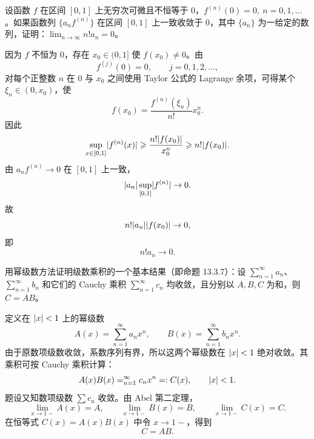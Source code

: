 \begin{xreferenceproblem}[6]
设函数 $f$ 在区间 $[0,1]$ 上无穷次可微且不恒等于 $0$，$f^{(n)}(0)=0,\ n=0,1,\ldots$。如果函数列 $\{a_nf^{(n)}\}$ 在区间 $[0,1]$ 上一致收敛于 $0$，其中 $\{a_n\}$ 为一给定的数列，证明：$\displaystyle\lim_{n\to\infty}n!a_n=0$。
\end{xreferenceproblem}
\begin{xsolution}
因为 $f$ 不恒为 $0$，存在 $x_0\in(0,1]$ 使 $f(x_0)\ne0$。由
\[
  f^{(j)}(0)=0,
  \qquad j=0,1,2,\ldots,
\]
对每个正整数 $n$ 在 $0$ 与 $x_0$ 之间使用 Taylor 公式的 Lagrange 余项，可得某个 $\xi_n\in(0,x_0)$，使
\[
  f(x_0)=\frac{f^{(n)}(\xi_n)}{n!}x_0^n.
\]
因此
\[
  \sup_{x\in[0,1]}\lvert f^{(n)}(x)\rvert
  \geqslant\frac{n!\lvert f(x_0)\rvert}{x_0^n}
  \geqslant n!\lvert f(x_0)\rvert.
\]
由 $a_nf^{(n)}\to0$ 在 $[0,1]$ 上一致，
\[
  \lvert a_n\rvert\sup_{[0,1]}\lvert f^{(n)}\rvert\to0.
\]
故
\[
  n!\lvert a_n\rvert\lvert f(x_0)\rvert\to0,
\]
即
\[
  \boxed{n!a_n\to0}.
\]
\end{xsolution}


\begin{xreferenceproblem}[7]
用幂级数方法证明级数乘积的一个基本结果（即命题 13.3.7）：设 $\displaystyle\sum_{n=1}^{\infty}a_n$、$\displaystyle\sum_{n=1}^{\infty}b_n$ 和它们的 Cauchy 乘积 $\displaystyle\sum_{n=1}^{\infty}c_n$ 均收敛，且分别以 $A,B,C$ 为和，则 $C=AB$。
\end{xreferenceproblem}
\begin{xsolution}
定义在 $\lvert x\rvert<1$ 上的幂级数
\[
  A(x)=\sum_{n=1}^{\infty}a_nx^n,
  \qquad
  B(x)=\sum_{n=1}^{\infty}b_nx^n.
\]
由于原数项级数收敛，系数序列有界，所以这两个幂级数在 $\lvert x\rvert<1$ 绝对收敛。其乘积可按 Cauchy 乘积计算：
\[
  A(x)B(x)=\relax_{n=1}^{\infty}c_nx^n=:C(x),
  \qquad \lvert x\rvert<1.
\]
题设又知数项级数 $\sum c_n$ 收敛。由 Abel 第二定理，
\[
  \lim_{x\to1-}A(x)=A,
  \qquad
  \lim_{x\to1-}B(x)=B,
  \qquad
  \lim_{x\to1-}C(x)=C.
\]
在恒等式 $C(x)=A(x)B(x)$ 中令 $x\to1-$，得到
\[
  \boxed{C=AB}.
\]
\end{xsolution}


